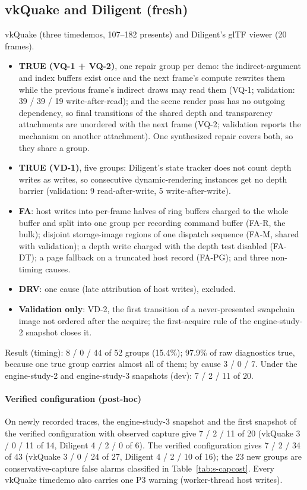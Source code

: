 \documentclass[acmtog,anonymous,review]{acmart}
\begin{document}
\subsection{vkQuake and Diligent (fresh)}
vkQuake (three timedemos, 107--182 presents) and Diligent's glTF viewer (20 frames).
\begin{itemize}
\item \textbf{TRUE (VQ-1 + VQ-2)}, one repair group per demo: the indirect-argument and index buffers exist once and the
  next frame's compute rewrites them while the previous frame's indirect draws may read them (VQ-1; validation: 39 / 39
  / 19 write-after-read); and the scene render pass has no outgoing dependency, so final transitions of the shared depth
  and transparency attachments are unordered with the next frame (VQ-2; validation reports the mechanism on another
  attachment). One synthesized repair covers both, so they share a group.
\item \textbf{TRUE (VD-1)}, five groups: Diligent's state tracker does not count depth writes as writes, so
  consecutive dynamic-rendering instances get no depth barrier (validation: 9 read-after-write, 5 write-after-write).
\item \textbf{FA}: host writes into per-frame halves of ring buffers charged to the whole buffer and split into one group
  per recording command buffer (FA-R, the bulk); disjoint storage-image regions of one dispatch sequence (FA-M, shared
  with validation); a depth write charged with the depth test disabled (FA-DT); a page fallback on a truncated host
  record (FA-PG); and three non-timing causes.
\item \textbf{DRV}: one cause (late attribution of host writes), excluded.
\item \textbf{Validation only}: VD-2, the first transition of a never-presented swapchain image not ordered after the
  acquire; the first-acquire rule of the engine-study-2 snapshot closes it.
\end{itemize}
Result (timing): 8 / 0 / 44 of 52 groups (15.4\%); 97.9\% of raw diagnostics true, because one true group carries
almost all of them; by cause 3 / 0 / 7. Under the engine-study-2 and engine-study-3 snapshots (dev): 7 / 2 / 11 of 20.

\paragraph{Verified configuration (post-hoc)}
On newly recorded traces, the engine-study-3 snapshot and the first snapshot of the verified configuration with
observed capture give 7 / 2 / 11 of 20 (vkQuake 3 / 0 / 11 of 14, Diligent 4 / 2 / 0 of 6). The verified configuration
gives 7 / 2 / 34 of 43 (vkQuake 3 / 0 / 24 of 27, Diligent 4 / 2 / 10 of 16); the 23 new
groups are conservative-capture false alarms classified in Table~\ref{tab:s-capcost}. Every vkQuake timedemo also
carries one P3 warning (worker-thread host writes).
\end{document}
